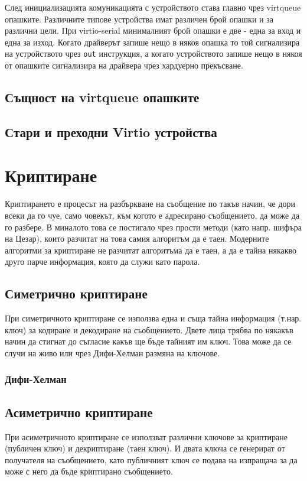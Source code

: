   След инициализацията комуникацията с устройството става главно чрез virtqueue опашките. Различните типове устройства имат различен брой опашки и за различни цели. При virtio-serial минималният брой опашки е две - една за вход и една за изход. Когато драйверът запише нещо в някоя опашка то той сигнализира на устройството чрез {\tt out} инструкция, а когато устройството запише нещо в някоя от опашките сигнализира на драйвера чрез хардуерно прекъсване.

  \subsection{Същност на virtqueue опашките}

  \subsection{Стари и преходни Virtio устройства}

\section{Криптиране}
Криптирането е процесът на разбъркване на съобщение по такъв начин, че дори всеки да го чуе, само човекът, към когото е адресирано съобщението, да може да го разбере. В миналото това се постигало чрез прости методи (като напр. шифъра на Цезар), които разчитат на това самия алгоритъм да е таен. Модерните алгоритми за криптиране не разчитат алгоритъма да е таен, а да е тайна някакво друго парче информация, която да служи като парола.

  \subsection{Симетрично криптиране}
  При симетричното криптиране се използва една и съща тайна информация (т.нар. ключ) за кодиране и декодиране на съобщението. Двете лица трябва по някакъв начин да стигнат до съгласие какъв ще бъде тайният им ключ. Това може да се случи на живо или чрез Дифи-Хелман размяна на ключове.

    \subsubsection{Дифи-Хелман}

  \subsection{Асиметрично криптиране}
  При асиметричното криптиране се използват различни ключове за криптиране (публичен ключ) и декриптиране (таен ключ). И двата ключа се генерират от получателя на съобщението, като публичният ключ се подава на изпращача за да може с него да бъде криптирано съобщението.

